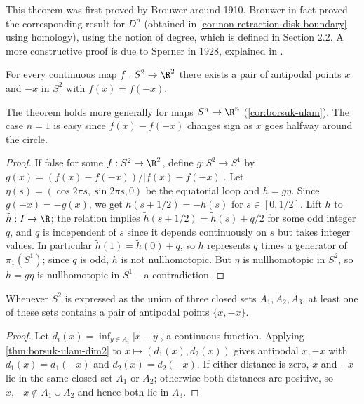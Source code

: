 This theorem was first proved by Brouwer around 1910. Brouwer in fact proved the
corresponding result for $D^n$ (obtained in \cref{cor:non-retraction-disk-boundary} using homology), using the notion of degree, which is defined in Section 2.2. A more
constructive proof is due to Sperner in 1928, explained in \cite{AignerZiegler1999}.

\begin{theorem}
\label{thm:borsuk-ulam-dim2}
For every continuous map $f : S^2 \to \R^2$ there exists a pair of antipodal points $x$
and $-x$ in $S^2$ with $f(x) = f(-x)$.
\end{theorem}

The theorem holds more generally for maps $S^n \to \R^n$ (\cref{cor:borsuk-ulam}). The case $n=1$ is easy since $f(x)-f(-x)$ changes sign as $x$ goes
halfway around the circle.

\begin{proof}
If false for some $f : S^2 \to \R^2$, define $g : S^2 \to S^1$ by
$g(x) = (f(x)-f(-x))/|f(x)-f(-x)|$. Let $\eta(s) = (\cos 2\pi s, \sin 2\pi s, 0)$ be the
equatorial loop and $h = g\eta$. Since $g(-x) = -g(x)$, we get $h(s+1/2) = -h(s)$ for
$s \in [0,1/2]$. Lift $h$ to $\tilde h : I \to \R$; the relation implies
$\tilde h(s+1/2) = \tilde h(s) + q/2$ for some odd integer $q$, and $q$ is independent of $s$
since it depends continuously on $s$ but takes integer values. In particular
$\tilde h(1) = \tilde h(0) + q$, so $h$ represents $q$ times a generator of $\pi_1(S^1)$; since $q$ is
odd, $h$ is not nullhomotopic. But $\eta$ is nullhomotopic in $S^2$, so $h = g\eta$ is
nullhomotopic in $S^1$ -- a contradiction.
\end{proof}

\begin{corollary}
\label{cor:sphere-three-closed-sets-antipodal}
Whenever $S^2$ is expressed as the union of three closed sets $A_1,A_2,A_3$, at least
one of these sets contains a pair of antipodal points $\{x,-x\}$.
\end{corollary}

\begin{proof}
Let $d_i(x) = \inf_{y\in A_i}|x-y|$, a continuous function. Applying
\cref{thm:borsuk-ulam-dim2} to $x \mapsto (d_1(x),d_2(x))$ gives antipodal $x,-x$ with
$d_1(x)=d_1(-x)$ and $d_2(x)=d_2(-x)$. If either distance is zero, $x$ and $-x$ lie in the
same closed set $A_1$ or $A_2$; otherwise both distances are positive, so $x,-x \notin A_1
\cup A_2$ and hence both lie in $A_3$.
\end{proof}

